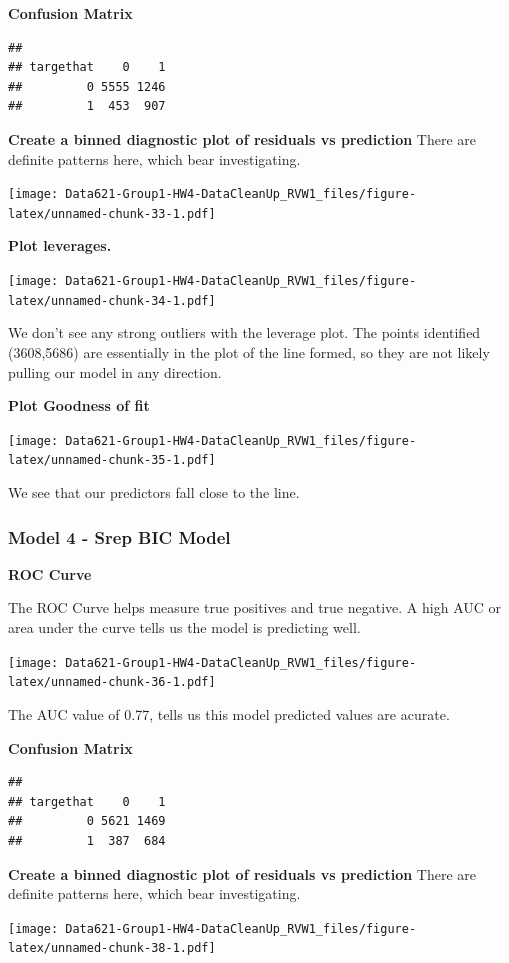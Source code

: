 \documentclass[]{article}
\begin{document}
\textbf{Confusion Matrix}

\begin{verbatim}
##          
## targethat    0    1
##         0 5555 1246
##         1  453  907
\end{verbatim}

\textbf{Create a binned diagnostic plot of residuals vs prediction}
There are definite patterns here, which bear investigating.

\texttt{[image: Data621-Group1-HW4-DataCleanUp\_RVW1\_files/figure-latex/unnamed-chunk-33-1.pdf]}

\textbf{Plot leverages.}

\texttt{[image: Data621-Group1-HW4-DataCleanUp\_RVW1\_files/figure-latex/unnamed-chunk-34-1.pdf]}

We don't see any strong outliers with the leverage plot. The points
identified (3608,5686) are essentially in the plot of the line formed,
so they are not likely pulling our model in any direction.

\textbf{Plot Goodness of fit}

\texttt{[image: Data621-Group1-HW4-DataCleanUp\_RVW1\_files/figure-latex/unnamed-chunk-35-1.pdf]}

We see that our predictors fall close to the line.

\subsubsection{Model 4 - Srep BIC Model}\label{model-4---srep-bic-model}

\textbf{ROC Curve}

The ROC Curve helps measure true positives and true negative. A high AUC
or area under the curve tells us the model is predicting well.

\texttt{[image: Data621-Group1-HW4-DataCleanUp\_RVW1\_files/figure-latex/unnamed-chunk-36-1.pdf]}

The AUC value of 0.77, tells us this model predicted values are acurate.

\textbf{Confusion Matrix}

\begin{verbatim}
##          
## targethat    0    1
##         0 5621 1469
##         1  387  684
\end{verbatim}

\textbf{Create a binned diagnostic plot of residuals vs prediction}
There are definite patterns here, which bear investigating.

\texttt{[image: Data621-Group1-HW4-DataCleanUp\_RVW1\_files/figure-latex/unnamed-chunk-38-1.pdf]}
\end{document}
